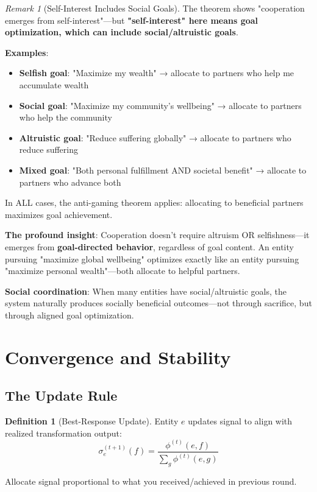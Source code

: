 \documentclass[11pt,a4paper]{article}
\theoremstyle{definition}
\newtheorem{definition}[theorem]{Definition}
\theoremstyle{remark}
\newtheorem{remark}[theorem]{Remark}
\begin{document}
\begin{remark}[Self-Interest Includes Social Goals]
The theorem shows "cooperation emerges from self-interest"—but \textbf{"self-interest" here means goal optimization, which can include social/altruistic goals}.

\textbf{Examples}:
\begin{itemize}
\item \textbf{Selfish goal}: "Maximize my wealth" → allocate to partners who help me accumulate wealth
\item \textbf{Social goal}: "Maximize my community's wellbeing" → allocate to partners who help the community
\item \textbf{Altruistic goal}: "Reduce suffering globally" → allocate to partners who reduce suffering
\item \textbf{Mixed goal}: "Both personal fulfillment AND societal benefit" → allocate to partners who advance both
\end{itemize}

In ALL cases, the anti-gaming theorem applies: allocating to beneficial partners maximizes goal achievement.

\textbf{The profound insight}: Cooperation doesn't require altruism OR selfishness—it emerges from \textbf{goal-directed behavior}, regardless of goal content. An entity pursuing "maximize global wellbeing" optimizes exactly like an entity pursuing "maximize personal wealth"—both allocate to helpful partners.

\textbf{Social coordination}: When many entities have social/altruistic goals, the system naturally produces socially beneficial outcomes—not through sacrifice, but through aligned goal optimization.
\end{remark}

\section{Convergence and Stability}

\subsection{The Update Rule}

\begin{definition}[Best-Response Update]
Entity $e$ updates signal to align with realized transformation output:
\[ \sigma_e^{(t+1)}(f) = \frac{\phi^{(t)}(e,f)}{\sum_g \phi^{(t)}(e,g)} \]

Allocate signal proportional to what you received/achieved in previous round.
\end{definition}
\end{document}
